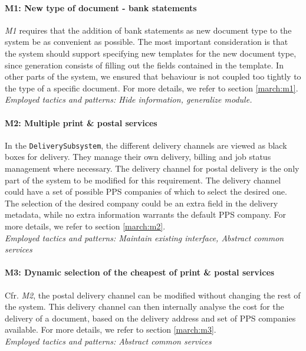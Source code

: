 \paragraph{M1: New type of document - bank statements} \emph{M1} requires that the addition of bank statements as new document type to the system be as convenient as possible. The most important consideration is that the system should support specifying new templates for the new document type, since generation consists of filling out the fields contained in the template. In other parts of the system, we ensured that behaviour is not coupled too tightly to the type of a specific document. For more details, we refer to section \ref{march:m1}.\\
\emph{Employed tactics and patterns: Hide information, generalize module.}
    
\paragraph{M2: Multiple print \& postal services} 
In the \texttt{DeliverySubsystem}, the different delivery channels are viewed as black boxes for delivery. They manage their own delivery, billing and job status management where necessary. The delivery channel for postal delivery is the only part of the system to be modified for this requirement. The delivery channel could have a set of possible PPS companies of which to select the desired one. The selection of the desired company could be an extra field in the delivery metadata, while no extra information warrants the default PPS company. For more details, we refer to section \ref{march:m2}.\\
\emph{Employed tactics and patterns: Maintain existing interface, Abstract common services}
    
\paragraph{M3: Dynamic selection of the cheapest of print \& postal services}
Cfr. \emph{M2}, the postal delivery channel can be modified without changing the rest of the system. This delivery channel can then internally analyse the cost for the delivery of a document, based on the delivery address and set of PPS companies available. For more details, we refer to section \ref{march:m3}.\\
\emph{Employed tactics and patterns: Abstract common services}

